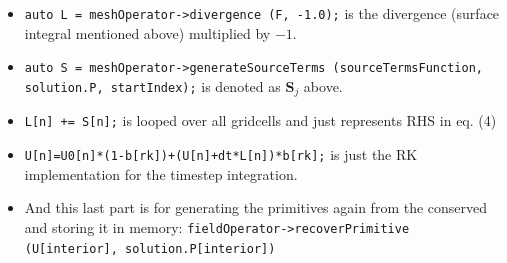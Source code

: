 \documentclass{article}
\begin{document}
\begin{itemize}
	\item \texttt{auto L = meshOperator->divergence (F, -1.0);} is the divergence (surface integral mentioned above) multiplied by $-1$.
	
	\item \texttt{auto S = meshOperator->generateSourceTerms (sourceTermsFunction, solution.P, startIndex);} is denoted as $\mathbf{S}_j$ above. 
	
	\item \texttt{L[n] += S[n];} is looped over all gridcells and just represents RHS in eq. (4)
	
	\item \texttt{U[n]=U0[n]*(1-b[rk])+(U[n]+dt*L[n])*b[rk];} is just the RK implementation for the timestep integration.
	
	\item And this last part is for generating the primitives again from the conserved and storing it in memory: \texttt{fieldOperator->recoverPrimitive (U[interior], solution.P[interior])}
\end{itemize}
\end{document}
